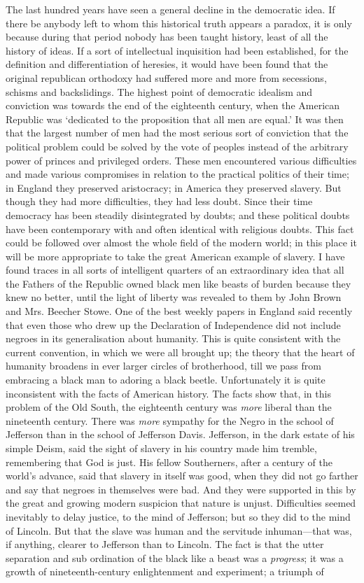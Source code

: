 \documentclass{book}
\begin{document}
The last hundred years have seen a general decline in the democratic idea. If there be anybody left to whom this historical truth appears a paradox, it is only because during that period nobody has been taught history, least of all the history of ideas. If a sort of intellectual inquisition had been established, for the definition and differentiation of heresies, it would have been found that the original republican orthodoxy had suffered more and more from secessions, schisms and backslidings. The highest point of democratic idealism and conviction was towards the end of the eighteenth century, when the American Republic was ‘dedicated to the proposition that all men are equal.’ It was then that the largest number of men had the most serious sort of conviction that the political problem could be solved by the vote of peoples instead of the arbitrary power of princes and privileged orders. These men encountered various difficulties and made various compromises in relation to the practical politics of their time; in England they preserved aristocracy; in America they preserved slavery. But though they had more difficulties, they had less doubt. Since their time democracy has been steadily disintegrated by doubts; and these political doubts have been contemporary with and often identical with religious doubts. This fact could be followed over almost the whole field of the modern world; in this place it will be more appropriate to take the great American example of slavery. I have found traces in all sorts of intelligent quarters of an extraordinary idea that all the Fathers of the Republic owned black men like beasts of burden because they knew no better, until the light of liberty was revealed to them by John Brown and Mrs. Beecher Stowe. One of the best weekly papers in England said recently that even those who drew up the Declaration of Independence did not include negroes in its generalisation about humanity. This is quite consistent with the current convention, in which we were all brought up; the theory that the heart of humanity broadens in ever larger circles of brotherhood, till we pass from embracing a black man to adoring a black beetle. Unfortunately it is quite inconsistent with the facts of American history. The facts show that, in this problem of the Old South, the eighteenth century was \emph{more} liberal than the nineteenth century. There was \emph{more} sympathy for the Negro in the school of Jefferson than in the school of Jefferson Davis. Jefferson, in the dark estate of his simple Deism, said the sight of slavery in his country made him tremble, remembering that God is just. His fellow Southerners, after a century of the world’s advance, said that slavery in itself was good, when they did not go farther and say that negroes in themselves were bad. And they were supported in this by the great and growing modern suspicion that nature is unjust. Difficulties seemed inevitably to delay justice, to the mind of Jefferson; but so they did to the mind of Lincoln. But that the slave was human and the servitude inhuman—that was, if anything, clearer to Jefferson than to Lincoln. The fact is that the utter separation and sub ordination of the black like a beast was a \emph{progress}; it was a growth of nineteenth-century enlightenment and experiment; a triumph of 
\end{document}
